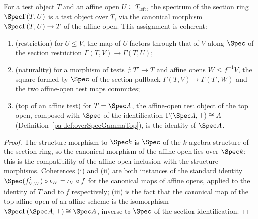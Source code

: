 \begin{definition}
  \label{pa-def:fromSpecAffine}
  \leanok

  For a test object \(T\) and an affine open \(U \subseteq T_{\mathrm{left}}\), the spectrum
  of the section ring \(\Spec \Gamma(T, U)\) is a test object over \(T\), via the canonical
  morphism \(\Spec \Gamma(T,U) \to T\) of the affine open. This assignment is coherent:
  \begin{enumerate}
  \item (restriction) for \(U \le V\), the map of \(U\) factors through that of \(V\) along
    \(\Spec\) of the section restriction \(\Gamma(T,V) \to \Gamma(T,U)\);
  \item (naturality) for a morphism of tests \(f \colon T' \to T\) and affine opens
    \(W \le f^{-1}V\), the square formed by \(\Spec\) of the section pullback
    \(\Gamma(T,V) \to \Gamma(T',W)\) and the two affine-open test maps commutes;
  \item (top of an affine test) for \(T = \Spec A\), the affine-open test object of the top
    open, composed with \(\Spec\) of the identification \(\Gamma(\Spec A, \top) \cong A\)
    (Definition~\ref{pa-def:overSpecGammaTop}), is the identity of \(\Spec A\).
  \end{enumerate}
\end{definition}
\begin{proof}
  \leanok
  The structure morphism to \(\Spec k\) is \(\Spec\) of the \(k\)-algebra structure of the
  section ring, so the canonical morphism of the affine open lies over \(\Spec k\); this is
  the compatibility of the affine-open inclusion with the structure morphisms. Coherences (i)
  and (ii) are both instances of the standard identity
  \(\Spec(f^{\sharp}_{V,W}) \circ \iota_W = \iota_V \circ f\) for the canonical maps of
  affine opens, applied to the identity of \(T\) and to \(f\) respectively; (iii) is the
  fact that the canonical map of the top affine open of an affine scheme is the isomorphism
  \(\Spec \Gamma(\Spec A, \top) \cong \Spec A\), inverse to \(\Spec\) of the section
  identification.
\end{proof}

